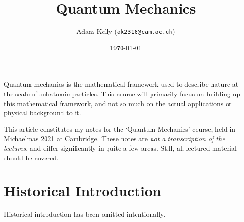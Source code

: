 \documentclass[a4paper]{scrartcl}
\title{Quantum Mechanics}
\author{Adam Kelly (\texttt{ak2316@cam.ac.uk})}
\date{\today}
\begin{document}
\maketitle


Quantum mechanics is the mathematical framework used to describe nature at the scale of subatomic particles. This course will primarily focus on building up this mathematical framework, and not so much on the actual applications or physical background to it.


This article constitutes my notes for the `Quantum Mechanics' course, held in Michaelmas 2021 at Cambridge. These notes are \emph{not a transcription of the lectures}, and differ significantly in quite a few areas. Still, all lectured material should be covered.



\tableofcontents

\section{Historical Introduction}

Historical introduction has been omitted intentionally.


\end{document}

